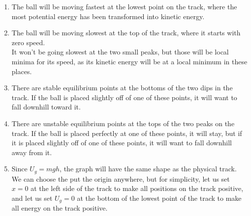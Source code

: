 \documentclass[]{article}
\begin{document}
\begin{TeacherMargin}
\begin{center}
\end{center}
\begin{enumerate}[(1)]
	\item The ball will be moving fastest at the lowest point on the track, where the most potential energy has been transformed into kinetic energy.
	\item The ball will be moving slowest at the top of the track, where it starts with zero speed. \\
	It won't be going slowest at the two small peaks, but those will be local minima for its speed, as its kinetic energy will be at a local minimum in these places.
	\item There are stable equilibrium points at the bottoms of the two dips in the track. If the ball is placed slightly off of one of these points, it will want to fall downhill toward it.
	\item There are unstable equilibrium points at the tops of the two peaks on the track. If the ball is placed perfectly at one of these points, it will stay, but if it is placed slightly off of one of these points, it will want to fall downhill away from it.
	\item Since $U_{g}=mgh$, the graph will have the same shape as the physical track. We can choose the put the origin anywhere, but for simplicity, let us set $x=0$ at the left side of the track to make all positions on the track positive, and let us set $U_{g}=0$ at the bottom of the lowest point of the track to make all energy on the track positive.
\end{enumerate}
\begin{center}
	\begin{tikzpicture}

\end{tikzpicture}
\end{center}
\end{TeacherMargin}
\end{document}
